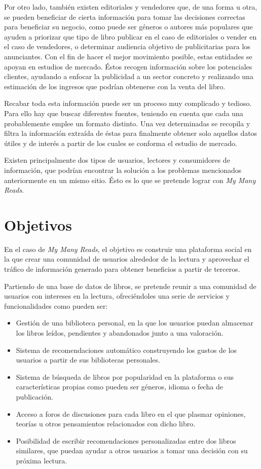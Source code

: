 Por otro lado, también existen editoriales y vendedores que, de una forma u otra, se pueden beneficiar de cierta información para tomar las decisiones correctas para beneficiar su negocio, como puede ser géneros o autores más populares que ayuden a priorizar que tipo de libro publicar en el caso de editoriales o vender en el caso de vendedores, o determinar audiencia objetivo de publicitarias para los anunciantes. Con el fin de hacer el mejor movimiento posible, estas entidades se apoyan en estudios de mercado. Éstos recogen información sobre los potenciales clientes, ayudando a enfocar la publicidad a un sector concreto y realizando una estimación de los ingresos que podrían obtenerse con la venta del libro.

Recabar toda esta información puede ser un proceso muy complicado y tedioso. Para ello hay que buscar diferentes fuentes, teniendo en cuenta que cada una probablemente emplee un formato distinto. Una vez determinadas se  recopila y filtra la información extraída de éstas para finalmente obtener solo aquellos datos útiles y de interés a partir de los cuales se conforma el estudio de mercado.

Existen principalmente dos tipos de usuarios, lectores y consumidores de información, que podrían encontrar la solución a los problemas mencionados anteriormente en un mismo sitio. Ésto es lo que se pretende lograr con \textit{My Many Reads}.

\section{Objetivos}
En el caso de \textit{My Many Reads}, el objetivo es construir una plataforma social en la que crear una comunidad de usuarios alrededor de la lectura y aprovechar el tráfico de información generado para obtener beneficios a partir de terceros. 

Partiendo de una base de datos de libros, se pretende reunir a una comunidad de usuarios con intereses en la lectura, ofreciéndoles una serie de servicios y funcionalidades como pueden ser:

\begin{itemize}
    \item Gestión de una biblioteca personal, en la que los usuarios puedan almacenar los libros leídos, pendientes y abandonados junto a una valoración.
    \item Sistema de recomendaciones automático construyendo los gustos de los usuarios a partir de sus bibliotecas personales.
    \item Sistema de búsqueda de libros por popularidad en la plataforma o sus características propias como pueden ser géneros, idioma o fecha de publicación.
    \item Acceso a foros de discusiones para cada libro en el que plasmar opiniones, teorías u otros pensamientos relacionados con dicho libro.
    \item Posibilidad de escribir recomendaciones personalizadas entre dos libros similares, que puedan ayudar a otros usuarios a tomar una decisión con su próxima lectura.
\end{itemize}

